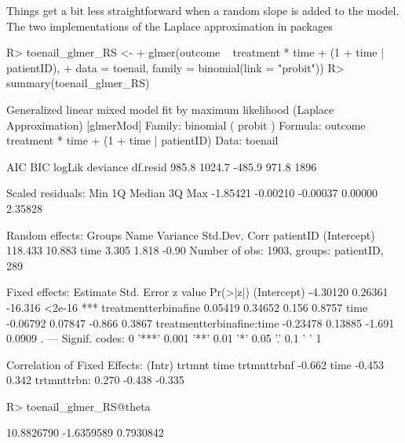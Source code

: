 \documentclass[article,nojss,shortnames]{jss}\usepackage[]{graphicx}\usepackage[]{xcolor}
\begin{document}
Things get a bit less straightforward when a random slope is added to the
model. The two implementations of the Laplace approximation in packages
\begin{Schunk}
\begin{Sinput}
R> toenail_glmer_RS <- 
+      glmer(outcome ~ treatment * time + (1 + time | patientID),
+            data = toenail, family = binomial(link = "probit"))
R> summary(toenail_glmer_RS)
\end{Sinput}
\begin{Soutput}
Generalized linear mixed model fit by maximum likelihood (Laplace
  Approximation) [glmerMod]
 Family: binomial  ( probit )
Formula: outcome ~ treatment * time + (1 + time | patientID)
   Data: toenail

     AIC      BIC   logLik deviance df.resid 
   985.8   1024.7   -485.9    971.8     1896 

Scaled residuals: 
     Min       1Q   Median       3Q      Max 
-1.85421 -0.00210 -0.00037  0.00000  2.35828 

Random effects:
 Groups    Name        Variance Std.Dev. Corr 
 patientID (Intercept) 118.433  10.883        
           time          3.305   1.818   -0.90
Number of obs: 1903, groups:  patientID, 289

Fixed effects:
                          Estimate Std. Error z value Pr(>|z|)    
(Intercept)               -4.30120    0.26361 -16.316   <2e-16 ***
treatmentterbinafine       0.05419    0.34652   0.156   0.8757    
time                      -0.06792    0.07847  -0.866   0.3867    
treatmentterbinafine:time -0.23478    0.13885  -1.691   0.0909 .  
---
Signif. codes:  0 '***' 0.001 '**' 0.01 '*' 0.05 '.' 0.1 ' ' 1

Correlation of Fixed Effects:
            (Intr) trtmnt time  
trtmnttrbnf -0.662              
time        -0.453  0.342       
trtmnttrbn:  0.270 -0.438 -0.335
\end{Soutput}
\begin{Sinput}
R> toenail_glmer_RS@theta
\end{Sinput}
\begin{Soutput}
[1] 10.8826790 -1.6359589  0.7930842
\end{Soutput}
\end{Schunk}
\end{document}

